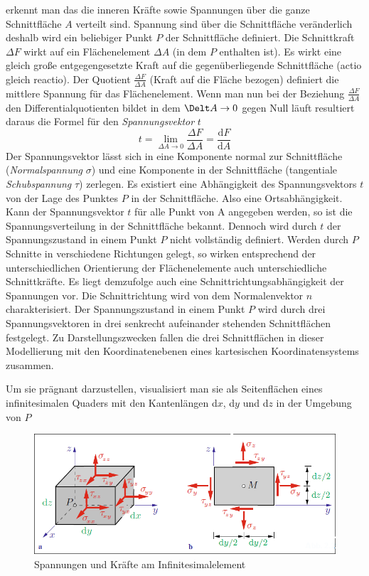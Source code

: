 \documentclass[12pt,a4paper,parskip,twoside,BCOR5mm,headsepline]{scrartcl}
\begin{document}
\begin{description*}
  
   erkennt man das die inneren Kräfte sowie Spannungen über die ganze Schnittfläche $ A $ verteilt sind. Spannung sind über die Schnittfläche veränderlich deshalb  wird ein beliebiger Punkt $ P $ der Schnittfläche definiert. Die Schnittkraft $ \Delta F $  wirkt auf ein Flächenelement $ \Delta A $ (in dem $ P $ enthalten ist). Es wirkt eine gleich große entgegengesetzte Kraft auf die gegenüberliegende Schnittfläche (actio gleich reactio). Der Quotient $ \frac{\Delta F}{\Delta A} $ (Kraft auf die Fläche bezogen) definiert die mittlere Spannung für das Flächenelement. Wenn man nun bei der Beziehung $ \frac{\Delta F}{\Delta A} $ den Differentialquotienten bildet in dem $ \Delt A \rightarrow 0 $ gegen Null läuft  resultiert daraus die Formel für den \emph{Spannungsvektor }$ t $ \begin{equation}
   t = \lim \limits_{\Delta A \to 0} \frac{\Delta F}{\Delta A} = \frac{\text{d}F}{\text{d}A}  
   \end{equation}
Der Spannungsvektor lässt sich in eine Komponente normal zur Schnittfläche (\emph{Normalspannung} $ \sigma $) und eine Komponente in der Schnittfläche (tangentiale \emph{Schubspannung} $ \tau $) zerlegen. Es existiert eine Abhängigkeit des Spannungsvektors $ t $ von der Lage des Punktes $ P $ in der Schnittfläche. Also eine Ortsabhängigkeit. Kann der Spannungsvektor $ t $ für alle Punkt von A angegeben werden, so ist die Spannungsverteilung in der Schnittfläche bekannt. Dennoch wird durch $ t $ der Spannungszustand in einem Punkt $ P $ nicht vollständig definiert. Werden durch $ P $ Schnitte in verschiedene Richtungen gelegt, so wirken entsprechend der unterschiedlichen Orientierung der Flächenelemente auch unterschiedliche Schnittkräfte. Es liegt demzufolge auch eine Schnittrichtungsabhängigkeit der Spannungen vor. Die Schnittrichtung wird von dem Normalenvektor $ n $ charakterisiert. Der Spannungszustand in einem Punkt $ P $ wird durch drei Spannungsvektoren in drei senkrecht aufeinander stehenden Schnittflächen festgelegt. Zu Darstellungszwecken fallen die drei Schnittflächen in dieser Modellierung mit den Koordinatenebenen eines kartesischen Koordinatensystems zusammen.

Um sie prägnant darzustellen, visualisiert man sie als Seitenflächen eines infinitesimalen Quaders mit den Kantenlängen d$ x $, d$ y $ und d$ z $ in der Umgebung von $ P $
\begin{figure}
  \centering
  \includegraphics[width=.8\textwidth]{tensor}
  \caption[Spannungen und Kräfte am Infinitesimalelement]{Spannungen und Kräfte am Infinitesimalelement\autocite[44]{tmr}}
  \label{fig:tensor}
  \end{figure}
 

\end{description*}
\end{document}
